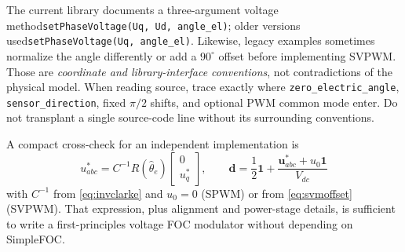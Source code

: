 \documentclass[10pt,letterpaper]{article}
\begin{document}
The current library documents a three-argument voltage method\linebreak[1] \texttt{setPhaseVoltage(Uq, Ud, angle\_el)}; older versions used\linebreak[1] \texttt{setPhaseVoltage(Uq, angle\_el)}. Likewise, legacy examples sometimes normalize the angle differently or add a $90^\circ$ offset before implementing SVPWM. Those are \emph{coordinate and library-interface conventions}, not contradictions of the physical model. When reading source, trace exactly where \texttt{zero\_electric\_angle}, \texttt{sensor\_direction}, fixed $\pi/2$ shifts, and optional PWM common mode enter. Do not transplant a single source-code line without its surrounding conventions.

A compact cross-check for an independent implementation is
\begin{equation}\label{eq:fullchain}
\boxed{\quad u_{abc}^*=C^{-1}R(\hat\theta_e)\begin{bmatrix}0\\u_q^*\end{bmatrix},\qquad
\bm d=\frac12\bm 1+\frac{\bm u_{abc}^*+u_0\bm 1}{V_{dc}}\quad}
\end{equation}
with $C^{-1}$ from \eqref{eq:invclarke} and $u_0=0$ (SPWM) or from \eqref{eq:svmoffset} (SVPWM). That expression, plus alignment and power-stage details, is sufficient to write a first-principles voltage FOC modulator without depending on SimpleFOC.
\end{document}
